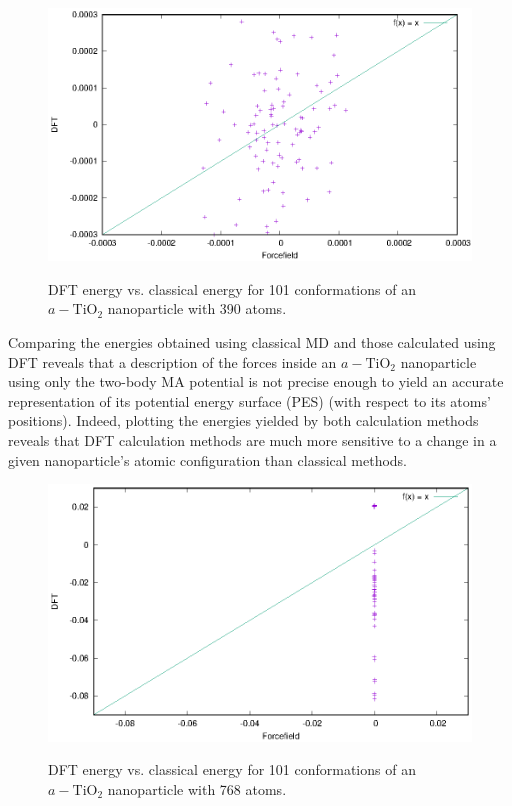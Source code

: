 \documentclass[aps,prb,twocolumn,amsmath,amssymb,superscriptaddress,longbibliography]{revtex4-1}
\newcommand\tab[1][1cm]{\hspace*{#1}} %
\begin{document}
\begin{figure}
\includegraphics[scale=1]{./plots/nnp_390_scaled}
\label{nnp_390}
\caption{DFT energy vs. classical energy for 101 conformations of an $a-\text{TiO}_2$ nanoparticle with 390 atoms.}
\end{figure}

\tab Comparing the energies obtained using classical MD and those calculated using DFT reveals that a description of the forces inside an $a-\text{TiO}_2$ nanoparticle using only the two-body MA potential is not precise enough to yield an accurate representation of its potential energy surface (PES) (with respect to its atoms' positions).
Indeed, plotting the energies yielded by both calculation methods reveals that DFT calculation methods are much more sensitive to a change in a given nanoparticle's atomic configuration than classical methods.


\begin{figure}
\includegraphics[scale=1]{./plots/nnp_768_fully_scaled}
\label{nnp_768}
\caption{DFT energy vs. classical energy for 101 conformations of an $a-\text{TiO}_2$ nanoparticle with 768 atoms.}
\end{figure}
\end{document}
